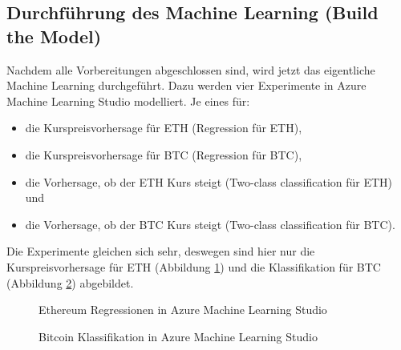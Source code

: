 \subsection{Durchführung des Machine Learning (Build the Model)}
Nachdem alle Vorbereitungen abgeschlossen sind, wird jetzt das eigentliche Machine Learning durchgeführt. Dazu werden vier Experimente in Azure Machine Learning Studio modelliert. Je eines für:
\begin{itemize}
\item die Kurspreisvorhersage für ETH (Regression für ETH),
\item die Kurspreisvorhersage für BTC (Regression für BTC),
\item die Vorhersage, ob der ETH Kurs steigt (Two-class classification für ETH) und
\item die Vorhersage, ob der BTC Kurs steigt (Two-class classification für BTC).
\end{itemize}
Die Experimente gleichen sich sehr, deswegen sind hier nur die Kurspreisvorhersage für ETH (Abbildung \ref{fig:azureETHReg}) und die Klassifikation für BTC (Abbildung \ref{fig:azureBTCClass}) abgebildet.

\begin{figure}[H]
\centering
{}
\caption{Ethereum Regressionen in Azure Machine Learning Studio}
\label{fig:azureETHReg}
\end{figure}

\begin{figure}[H]
\centering
{}
\caption{Bitcoin Klassifikation in Azure Machine Learning Studio}
\label{fig:azureBTCClass}
\end{figure}

